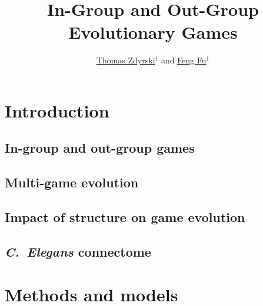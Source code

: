 \documentclass[pdflatex,lineno,referee,sn-mathphys-ay]{class/sn-jnl}
\begin{document}
\title{In-Group and Out-Group Evolutionary Games}

\author{
\href{https://orcid.org/0000-0003-3039-172X}{Thomas Zdyrski}$^{1}$
and
\href{https://orcid.org/0000-0001-8252-1990}{Feng Fu}$^{1}$
}




\maketitle
\tableofcontents

\section{Introduction}
\subsection{In-group and out-group games}
\subsection{Multi-game evolution}
\subsection{Impact of structure on game evolution}
\subsection{\emph{C.\ Elegans} connectome}

\section{Methods and models}
\end{document}

